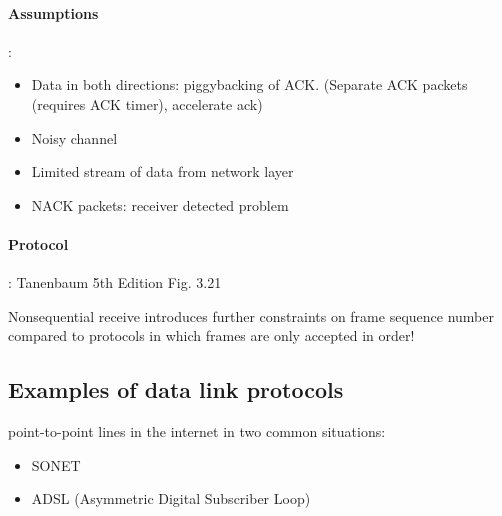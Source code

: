\paragraph{Assumptions}: 
\begin{itemize}
    \item Data in both directions: piggybacking of ACK. (Separate ACK packets (requires ACK timer), accelerate ack)
    \item Noisy channel
    \item Limited stream of data from network layer
    \item NACK packets: receiver detected problem
\end{itemize}

\paragraph{Protocol}: Tanenbaum 5th Edition Fig. 3.21

Nonsequential receive introduces further constraints on frame sequence number compared to protocols in which frames are only accepted in order!





\subsection{Examples of data link protocols}
point-to-point lines in the internet in two common situations:
\begin{itemize}
    \item SONET 
    \item ADSL (Asymmetric Digital Subscriber Loop)
\end{itemize}

